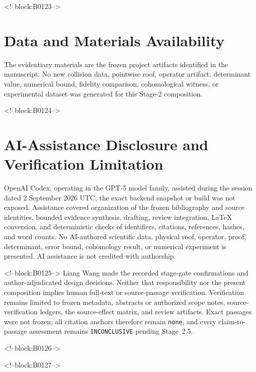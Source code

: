 \documentclass[11pt,a4paper]{article}
\begin{document}
<!--block:B0123-->
\section*{Data and Materials Availability}
The evidentiary materials are the frozen project artifacts identified in the manuscript. No new collision data, pointwise roof, operator artifact, determinant value, numerical bound, fidelity comparison, cohomological witness, or experimental dataset was generated for this Stage-2 composition.

<!--block:B0124-->
\section*{AI-Assistance Disclosure and Verification Limitation}
OpenAI Codex, operating in the GPT-5 model family, assisted during the session dated 2 September 2026 UTC; the exact backend snapshot or build was not exposed. Assistance covered organization of the frozen bibliography and source identities, bounded evidence synthesis, drafting, review integration, LaTeX conversion, and deterministic checks of identifiers, citations, references, hashes, and word counts. No AI-authored scientific data, physical roof, operator, proof, determinant, error bound, cohomology result, or numerical experiment is presented. AI assistance is not credited with authorship.

<!--block:B0125-->
Liang Wang made the recorded stage-gate confirmations and author-adjudicated design decisions. Neither that responsibility nor the present composition implies human full-text or source-passage verification. Verification remains limited to frozen metadata, abstracts or authorized scope notes, source-verification ledgers, the source-effect matrix, and review artifacts. Exact passages were not frozen; all citation anchors therefore remain \texttt{none}, and every claim-to-passage assessment remains \texttt{INCONCLUSIVE} pending Stage~2.5.

<!--block:B0126-->



<!--block:B0127-->
\end{document}
